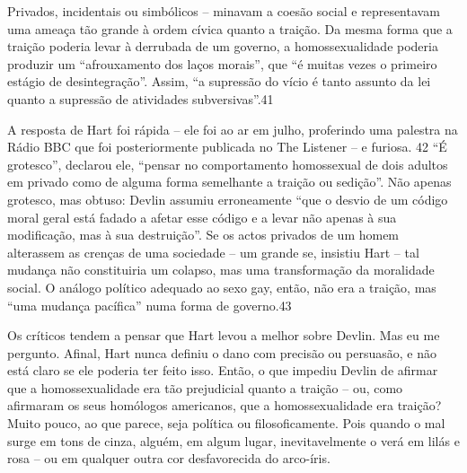 Privados, incidentais ou simbólicos – minavam a coesão social e representavam uma ameaça tão grande à ordem cívica quanto a traição. Da mesma forma que a traição poderia levar à derrubada de um governo, a homossexualidade poderia produzir um “afrouxamento dos laços morais”, que “é muitas vezes o primeiro estágio de desintegração”. Assim, “a supressão do vício é tanto assunto da lei quanto a supressão de atividades subversivas”.{\color{blue}41}
 \par 
A resposta de Hart foi rápida – ele foi ao ar em julho, proferindo uma palestra na Rádio BBC que foi posteriormente publicada no The Listener – e furiosa. {\color{blue}42} “É grotesco”, declarou ele, “pensar no comportamento homossexual de dois adultos em privado como de alguma forma semelhante a traição ou sedição”. Não apenas grotesco, mas obtuso: Devlin assumiu erroneamente “que o desvio de um código moral geral está fadado a afetar esse código e a levar não apenas à sua modificação, mas à sua destruição”. Se os actos privados de um homem alterassem as crenças de uma sociedade – um grande se, insistiu Hart – tal mudança não constituiria um colapso, mas uma transformação da moralidade social. O análogo político adequado ao sexo gay, então, não era a traição, mas “uma mudança pacífica” numa forma de governo.{\color{blue}43}
 \par 
Os críticos tendem a pensar que Hart levou a melhor sobre Devlin. Mas eu me pergunto. Afinal, Hart nunca definiu o dano com precisão ou persuasão, e não está claro se ele poderia ter feito isso. Então, o que impediu Devlin de afirmar que a homossexualidade era tão prejudicial quanto a traição – ou, como afirmaram os seus homólogos americanos, que a homossexualidade era traição? Muito pouco, ao que parece, seja política ou filosoficamente. Pois quando o mal surge em tons de cinza, alguém, em algum lugar, inevitavelmente o verá em lilás e rosa – ou em qualquer outra cor desfavorecida do arco-íris.